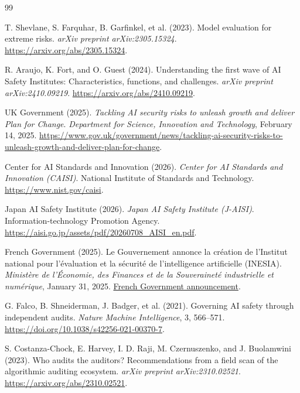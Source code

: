 \documentclass{article}
\begin{document}
\clearpage
\begingroup
\small
\begin{thebibliography}{99}

T. Shevlane, S. Farquhar, B. Garfinkel, et al. (2023).
Model evaluation for extreme risks.
\emph{arXiv preprint arXiv:2305.15324}.
\url{https://arxiv.org/abs/2305.15324}.

R. Araujo, K. Fort, and O. Guest (2024).
Understanding the first wave of AI Safety Institutes: Characteristics, functions, and challenges.
\emph{arXiv preprint arXiv:2410.09219}.
\url{https://arxiv.org/abs/2410.09219}.

UK Government (2025).
\emph{Tackling AI security risks to unleash growth and deliver Plan for Change}.
\emph{Department for Science, Innovation and Technology}, February 14, 2025.
\url{https://www.gov.uk/government/news/tackling-ai-security-risks-to-unleash-growth-and-deliver-plan-for-change}.

Center for AI Standards and Innovation (2026).
\emph{Center for AI Standards and Innovation (CAISI)}.
National Institute of Standards and Technology.
\url{https://www.nist.gov/caisi}.

Japan AI Safety Institute (2026).
\emph{Japan AI Safety Institute (J-AISI)}.
Information-technology Promotion Agency.
\url{https://aisi.go.jp/assets/pdf/20260708_AISI_en.pdf}.

French Government (2025).
Le Gouvernement annonce la cr\'eation de l'Institut national pour
l'\'evaluation et la s\'ecurit\'e de l'intelligence artificielle (INESIA).
\emph{Minist\`ere de l'\'Economie, des Finances et de la Souverainet\'e
industrielle et num\'erique}, January 31, 2025.
\href{https://presse.economie.gouv.fr/le-gouvernement-annonce-la-creation-de-linstitut-national-pour-levaluation-et-la-securite-de-lintelligence-artificielle-inesia/}{French Government announcement}.

G. Falco, B. Shneiderman, J. Badger, et al. (2021).
Governing AI safety through independent audits.
\emph{Nature Machine Intelligence}, 3, 566--571.
\url{https://doi.org/10.1038/s42256-021-00370-7}.

S. Costanza-Chock, E. Harvey, I. D. Raji, M. Czernuszenko, and J. Buolamwini (2023).
Who audits the auditors? Recommendations from a field scan of the algorithmic auditing ecosystem.
\emph{arXiv preprint arXiv:2310.02521}.
\url{https://arxiv.org/abs/2310.02521}.


\end{thebibliography}
\end{document}
